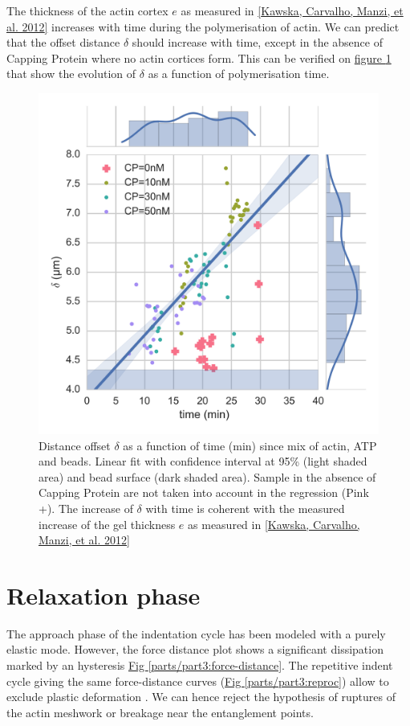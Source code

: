 \documentclass[A4paperpaper,11pt,english]{sphinxmanual}
\begin{document}
The thickness of the actin cortex \(e\) as measured in {\hyperref[parts/part3:kawska2012]{{[}Kawska, Carvalho, Manzi,  et al.  2012{]}}}
increases with time during the polymerisation of actin. We can predict that the
offset distance \(\delta\) should increase with time, except in the absence of
Capping Protein where no actin cortices form. This can be verified on
\hyperref[parts/part3:time-delta-corr]{figure  \ref*{parts/part3:time-delta-corr}} that show the evolution of \(\delta\) as a function
of polymerisation time.
\begin{figure}[htbp]
\centering
\capstart

\includegraphics[width=0.800\linewidth]{time-delta-corr.png}
\caption{Distance offset \(\delta\) as a function of time (min) since mix of actin, ATP
and beads. Linear fit with confidence interval at 95\% (light shaded area)
and bead surface (dark shaded area). Sample in the absence of Capping
Protein are not taken into account in the regression (Pink +). The increase
of \(\delta\) with time is coherent with the measured increase of the gel
thickness \(e\) as measured in {\hyperref[parts/part3:kawska2012]{{[}Kawska, Carvalho, Manzi,  et al.  2012{]}}}}\label{parts/part3:time-delta-corr}\end{figure}


\section{Relaxation phase}
\label{parts/part3:id31}
The approach phase of the indentation cycle has been modeled with a purely
elastic mode. However, the force distance plot shows a significant dissipation
marked by an hysteresis \hyperref[parts/part3:force-distance]{Fig  \ref*{parts/part3:force-distance}}. The repetitive indent cycle giving the same
force-distance curves (\hyperref[parts/part3:reproc]{Fig  \ref*{parts/part3:reproc}}) allow to exclude plastic deformation
. We can hence reject the hypothesis of ruptures of the
actin meshwork or breakage near the entanglement points.
\end{document}
